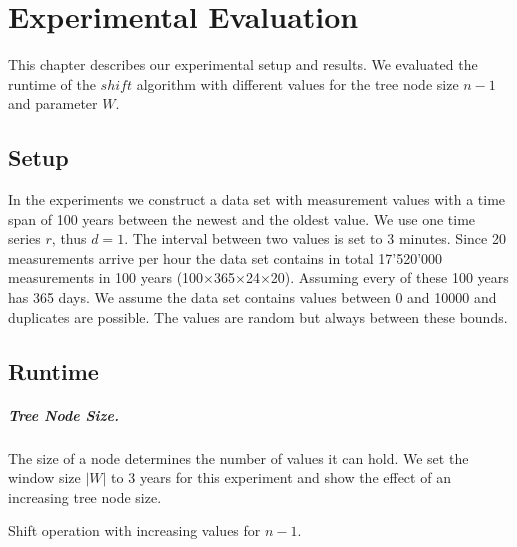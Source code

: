 \documentclass[abstracton,12pt,oneside]{scrreprt}
\begin{document}
\chapter{Experimental Evaluation}
\label{sec:Experimental}
This chapter describes our experimental setup and results. We evaluated the runtime of the $shift$ algorithm with different values for the tree node size $n-1$ and parameter $W$. 


\section{Setup}
In the experiments we construct a data set with measurement values with a time span of 100 years between the newest and the oldest value. We use one time series $r$, thus $d=1$. The interval between two values is set to $3$ minutes. Since 20 measurements arrive per hour the data set contains in total 17'520'000 measurements in 100 years (100$\times$365$\times$24$\times$20). Assuming every of these 100 years has 365 days. We assume the data set contains values between 0 and 10000 and duplicates are possible. The values are random but always between these bounds. 

\section{Runtime}


\paragraph{Tree Node Size.}
The size of a node determines the number of values it can hold. We set the window size $|W|$ to 3 years for this experiment and show the effect of an increasing tree node size. 

\begin{table}[H]
	\centering
	\caption{Shift operation with increasing values for $n-1$.}
\end{table}
\end{document}
